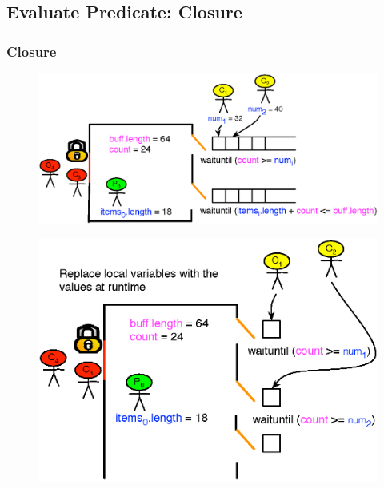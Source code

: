 \documentclass[mathserif,14pt,xcolor=table]{beamer}
\begin{document}
\subsection{Evaluate Predicate: Closure}
\begin{frame}
    \frametitle{Closure}
     {
        \begin{figure}[ht!]
            \centering
            \includegraphics[scale=0.75]{fig/eval_exp_1.eps}
        \end{figure}
    }
     {
        \begin{figure}[ht!]
            \centering
            \includegraphics[scale=0.75]{fig/eval_exp_2.eps}
        \end{figure}
    }
     {
        \begin{figure}[ht!]
            \centering

\end{figure}}
\end{frame}
\end{document}
